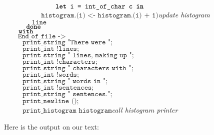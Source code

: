 \documentclass[]{book}
\newcommand{\plet}{\textbf{let}\xspace}
\newcommand{\pin}{\textbf{in}\xspace}
\newcommand{\pwith}{\textbf{with}\xspace}
\newcommand{\pdone}{\textbf{done}\xspace}
\newcommand{\smspace}{\vspace{4mm}}
\begin{document}
\begin{center}
{\begin{minipage}{0.8\textwidth}
$\texttt{~~~~~~~~~~~~~~\plet i = int\_of\_char c \pin}$\\
$\texttt{~~~~~~~~~~~~~~~~histogram.(i) <- histogram.(i) + 1)}$\hfill\textit{update histogram}\\
$\texttt{~~~~~~~~~~~~line}$\\
$\texttt{~~~~~~\pdone}$\\
$\texttt{~~~~\pwith}$\\
$\texttt{~~~~~~End\_of\_file ->}$\\
$\texttt{~~~~~~~~print\_string "There were ";}$\\
$\texttt{~~~~~~~~print\_int !lines;}$\\
$\texttt{~~~~~~~~print\_string " lines, making up ";}$\\
$\texttt{~~~~~~~~print\_int !characters;}$\\
$\texttt{~~~~~~~~print\_string " characters with ";}$\\
$\texttt{~~~~~~~~print\_int !words;}$\\
$\texttt{~~~~~~~~print\_string " words in ";}$\\
$\texttt{~~~~~~~~print\_int !sentences;}$\\
$\texttt{~~~~~~~~print\_string " sentences.";}$\\
$\texttt{~~~~~~~~print\_newline ();}$\\
$\texttt{~~~~~~~~print\_histogram histogram}$\hfill\textit{call histogram printer}\vphantom{g}
\end{minipage}}
\end{center}
\smspace

\noindent Here is the output on our text:
\end{document}
